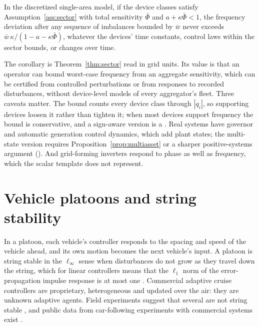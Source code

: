 \begin{corollary}\label{cor:grid}
In the discretized single-area model, if the device classes satisfy Assumption~\ref{ass:sector} with total sensitivity $\bar\Phi$ and $a+\kappa\bar\Phi<1$, the frequency deviation after any sequence of imbalances bounded by $\bar w$ never exceeds $\bar w\,\kappa/(1-a-\kappa\bar\Phi)$, whatever the devices' time constants, control laws within the sector bounds, or changes over time. \hfill\Proved
\end{corollary}

The corollary is Theorem~\ref{thm:sector} read in grid units. Its value is that an operator can bound worst-case frequency from an aggregate sensitivity, which can be certified from controlled perturbations or from responses to recorded disturbances, without device-level models of every aggregator's fleet. Three caveats matter. The bound counts every device class through $|q_i|$, so supporting devices loosen it rather than tighten it; when most devices support frequency the bound is conservative, and a sign-aware version is a \Target{}. Real systems have governor and automatic generation control dynamics, which add plant states; the multi-state version requires Proposition~\ref{prop:multiasset} or a sharper positive-systems argument (\Target{}). And grid-forming inverters respond to phase as well as frequency, which the scalar template does not represent.


\section{Vehicle platoons and string stability}\label{sec:bm_platoon}

In a platoon, each vehicle's controller responds to the spacing and speed of the vehicle ahead, and its own motion becomes the next vehicle's input. A platoon is string stable in the $\ell_\infty$ sense when disturbances do not grow as they travel down the string, which for linear controllers means that the $\ell_1$ norm of the error-propagation impulse response is at most one \citep{t:swaroop1996}. Commercial adaptive cruise controllers are proprietary, heterogeneous and updated over the air: they are unknown adaptive agents. Field experiments suggest that several are not string stable \citep{t:gunter2021}, and public data from car-following experiments with commercial systems exist \citep{t:makridis2021}.

